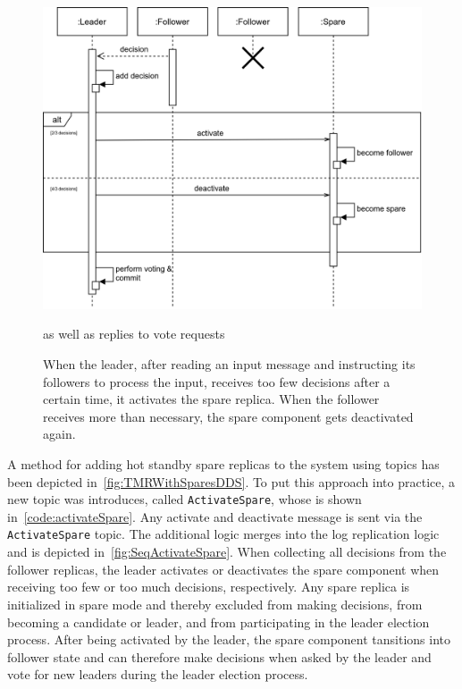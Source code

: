 \begin{figure}[!hb]
	\centering
	\includegraphics[width=0.75\linewidth]{images/sequence/ActivateSpare}
	\caption{When the leader, after reading an input message and instructing its followers to process the input, receives too few decisions after a certain time, it activates the spare replica. When the follower receives more than necessary, the spare component gets deactivated again.} as well as replies to vote requests
	\label{fig:SeqActivateSpare}
\end{figure}

A method for adding hot standby spare replicas to the system using  topics has been depicted in~\autoref{fig:TMRWithSparesDDS}.
To put this approach into practice, a new topic was introduces, called \texttt{ActivateSpare}, whose  is shown in~\autoref{code:activateSpare}.
Any activate and deactivate message is sent via the \texttt{ActivateSpare} topic.
The additional logic merges into the log replication logic and is depicted in~\autoref{fig:SeqActivateSpare}.
When collecting all decisions from the follower replicas, the leader activates or deactivates the spare component when receiving too few or too much decisions, respectively.
Any spare replica is initialized in spare mode and thereby excluded from making decisions, from becoming a candidate or leader, and from participating in the leader election process.
After being activated by the leader, the spare component tansitions into follower state and can therefore make decisions when asked by the leader and vote for new leaders during the leader election process.


